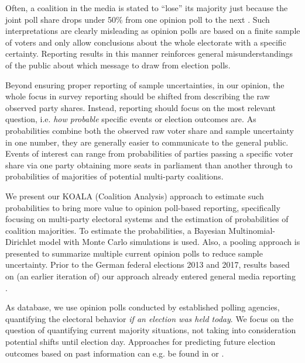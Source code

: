 \documentclass[smallcondensed]{svjour3}     %
\begin{document}
Often, a coalition in the media is stated to ``lose'' its majority
just because the joint poll share drops under 50\% from one opinion poll to
the next \citep[cf.][]{umfrage_2017}.
Such interpretations are clearly misleading as opinion polls are based on a finite sample
of voters and only allow conclusions about the whole electorate
with a specific certainty. Reporting results in this manner
reinforces general misunderstandings of the public about which message
to draw from election polls.


Beyond ensuring proper reporting of sample uncertainties, in our opinion, the
whole focus in survey reporting should be shifted from describing the raw
observed party shares. Instead, reporting should focus on the most relevant
question, i.e. {\it how probable} specific events or election outcomes are.
As probabilities combine both the observed raw voter share
and sample uncertainty in one number, they are generally easier to
communicate to the general public.
Events of interest can range from probabilities of parties passing
a specific voter share via one party obtaining more seats in parliament
than another through to probabilities of majorities of potential multi-party coalitions.

We present our KOALA (Coalition Analysis) approach to estimate such probabilities
to bring more value to opinion poll-based reporting, specifically focusing on
multi-party electoral systems and the estimation of probabilities of coalition
majorities. To estimate the probabilities, a Bayesian Multinomial-Dirichlet model
with Monte Carlo simulations is used. Also, a pooling approach is presented to summarize
multiple current opinion polls to reduce sample uncertainty.
Prior to the German federal elections 2013 and 2017, results based on (an earlier iteration of)
our approach already entered general media reporting \citep[cf.][]{wahlistik_2013, gelitz_2017}.

As database, we use opinion polls conducted by established polling agencies,
quantifying the electoral behavior \textit{if an election was held today}.
We focus on the question of quantifying current majority situations, not
taking into consideration potential shifts until election day.
Approaches for predicting future election outcomes based on past
information can e.g. be found in \citet{graefe_2017} or \citet{norpoth_gschwend_2010}.
\end{document}
